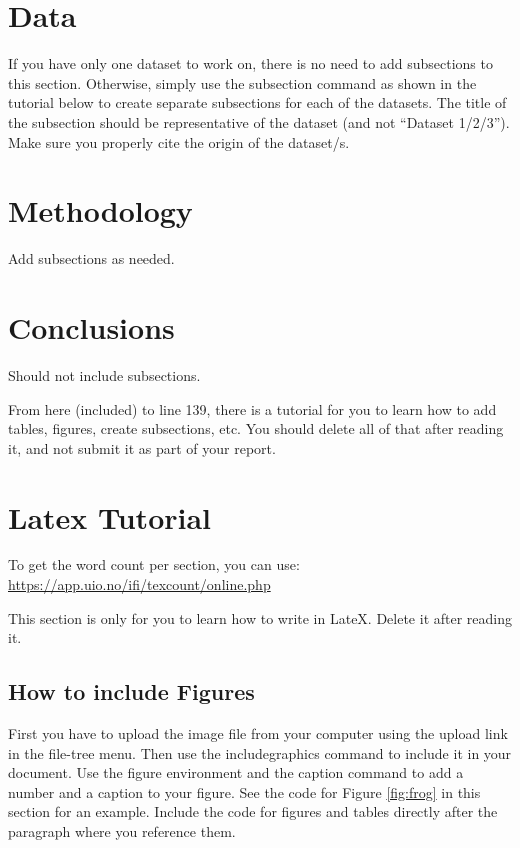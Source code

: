 \documentclass{article}
\begin{document}
\section{Data}

If you have only one dataset to work on, there is no need to add subsections to this section. Otherwise, simply use the subsection command as shown in the tutorial below to create separate subsections for each of the datasets. The title of the subsection should be representative of the dataset (and not ``Dataset 1/2/3''). Make sure you properly cite the origin of the dataset/s.

\section{Methodology}

Add subsections as needed.

\section{Conclusions}

Should not include subsections.

From here (included) to line 139, there is a tutorial for you to learn how to add tables, figures, create subsections, etc. You should delete all of that after reading it, and not submit it as part of your report.

\section{Latex Tutorial}
\label{sec:tutorial}

To get the word count per section, you can use: \url{https://app.uio.no/ifi/texcount/online.php}

This section is only for you to learn how to write in LateX. Delete it after reading it.


\subsection{How to include Figures}

First you have to upload the image file from your computer using the upload link in the file-tree menu. Then use the includegraphics command to include it in your document. Use the figure environment and the caption command to add a number and a caption to your figure. See the code for Figure \ref{fig:frog} in this section for an example. Include the code for figures and tables directly after the paragraph where you reference them.
\end{document}
